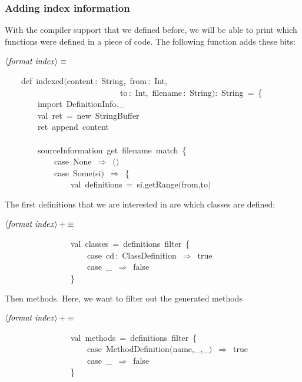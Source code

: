 \documentclass[a4paper,12pt]{article}
\begin{document}
\subsubsection{Adding index information}
With the compiler support that we defined before, we will be able to print
which functions were defined in a piece of code. The following function adds
these bits:

$\left<\mbox{\emph{format index}}\right>\equiv$
\begin{program}~~~~{\vem def}~indexed$($content\,{\rm :}~String,~from\,{\rm :}~Int,
\\~~~~~~~~~~~~~~~~~~~~~~~~~~~~to\,{\rm :}~Int,~filename\,{\rm :}~String$)${\rm :}~String~=~{\small\{}
\\~~~~~~~~{\vem import}~DefinitionInfo.\_
\\~~~~~~~~{\vem val}~ret~=~{\vem new}~StringBuffer
\\~~~~~~~~ret~append~content
\\~~~~~~~~
\\~~~~~~~~sourceInformation~get~filename~{\vem match}~{\small\{}
\\~~~~~~~~~~~~{\vem case}~None~$\Rightarrow$~$($$)$
\\~~~~~~~~~~~~{\vem case}~Some$($si$)$~$\Rightarrow$~{\small\{}
\\~~~~~~~~~~~~~~~~{\vem val}~definitions~=~si.getRange$($from,to$)$
\\[0.5em]\end{program}



The first definitions that we are interested in are which classes
are defined:

$\left<\mbox{\emph{format index}}\right>+\equiv$
\begin{program}~~~~~~~~~~~~~~~~{\vem val}~classes~=~definitions~filter~{\small\{}
\\~~~~~~~~~~~~~~~~~~~~{\vem case}~cd\,{\rm :}~ClassDefinition~$\Rightarrow$~{\vem true}
\\~~~~~~~~~~~~~~~~~~~~{\vem case}~\_~$\Rightarrow$~{\vem false}
\\~~~~~~~~~~~~~~~~{\small\}}
\\[0.5em]\end{program}


Then methods. Here, we want to filter out the generated methods

$\left<\mbox{\emph{format index}}\right>+\equiv$
\begin{program}~~~~~~~~~~~~~~~~{\vem val}~methods~=~definitions~filter~{\small\{}
\\~~~~~~~~~~~~~~~~~~~~{\vem case}~MethodDefinition$($name,\_,\_$)$~$\Rightarrow$~{\vem true}
\\~~~~~~~~~~~~~~~~~~~~{\vem case}~\_~$\Rightarrow$~{\vem false}
\\~~~~~~~~~~~~~~~~{\small\}}
\\[0.5em]\end{program}
\end{document}
